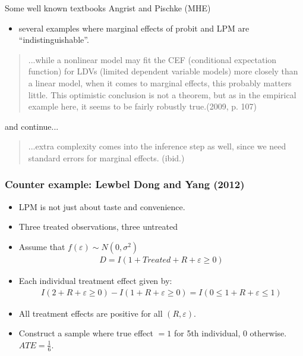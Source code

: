 \begin{frame}{Some well known textbooks}
Angrist and Pischke (MHE) 
\begin{itemize}
\item several examples where marginal effects of probit and LPM are ``indistinguishable''.
\end{itemize}

\begin{quote}
...while a nonlinear model may fit the CEF (conditional expectation function) for LDVs (limited dependent variable models) more closely than a linear model, when it comes to marginal effects, this probably matters little. This optimistic conclusion is not a theorem, but as in the empirical example here, it seems to be fairly robustly true.(2009, p. 107)
\end{quote}
and continue...
\begin{quote}
...extra complexity comes into the inference step as well, since we need standard errors for marginal effects. (ibid.)
\end{quote}
\end{frame}

\begin{frame}
\frametitle{Counter example: Lewbel Dong and Yang (2012)}
\begin{itemize}
\item LPM is not just about taste and convenience.
\item Three treated observations, three untreated %
\item Assume that $f(\varepsilon) \sim N(0,\sigma^2)$
\begin{eqnarray*}
D = I ( 1 + Treated + R + \varepsilon \geq 0 ) 
\end{eqnarray*}
\item Each individual treatment effect given by:
\begin{eqnarray*}
 I ( 2 + R + \varepsilon \geq 0 ) -  I ( 1 + R + \varepsilon \geq 0 )  =  I ( 0 \leq 1 + R + \varepsilon \leq 1 ) 
\end{eqnarray*}
\item All treatment effects are positive for all $(R,\varepsilon)$.
\item Construct a sample where true effect $=1$ for 5th individual, 0 otherwise. $ATE= \frac{1}{6}$.
\end{itemize}
\end{frame}

